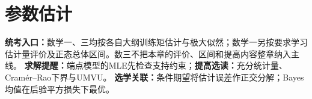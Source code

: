\chapter{参数估计}\label{ch:07}
\begin{examtip}
\textbf{统考入口：}数学一、三均按各自大纲训练矩估计与极大似然；数学一另按要求学习估计量评价及正态总体区间。数三不把本章的评价、区间和提高内容整章纳入主线。
\textbf{求解提醒：}端点模型的MLE先检查支持约束；\textbf{提高选读：}充分统计量、Cramér--Rao下界与UMVU。
\textbf{选学关联：}条件期望将估计误差作正交分解；Bayes均值在后验平方损失下最优。
\end{examtip}

